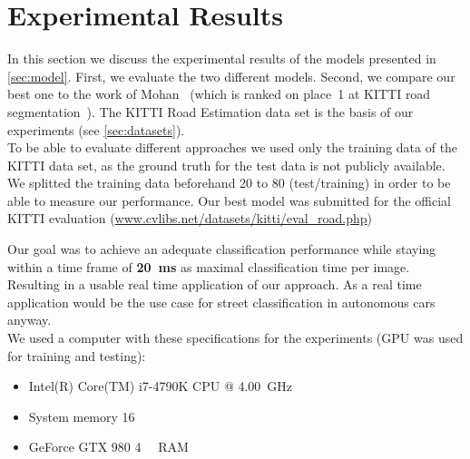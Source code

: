 
\section{Experimental Results}\label{sec:evaluation}

In this section we discuss the experimental results of the models
presented in \cref{sec:model}. First, we evaluate the two different
models. Second, we compare our best one to the work of
Mohan~\cite{Tarel2009} (which is ranked on place~1 at KITTI road
segmentation~\cite{Tarel2009}). The KITTI Road Estimation data set is the basis
of our experiments (see \cref{sec:datasets}). \\
To be able to evaluate different approaches we used only the
training data of the KITTI data set, as the ground truth for the test data is
not publicly available. We splitted the training data beforehand 20 to 80
(test/training) in order to be able to measure our performance. Our best model
was submitted for the official KITTI evaluation
(\href{http://www.cvlibs.net/datasets/kitti/eval_road.php}{www.cvlibs.net/datasets/kitti/eval\_road.php})


Our goal was to achieve an adequate classification performance while staying
within a time frame of \textbf{\SI{20}{\milli\second}} as maximal
classification time per image. Resulting in a usable real time application of
our approach. As a real time application would be the use case for street
classification in autonomous cars anyway.\\

We used a computer with these specifications for the experiments (GPU was used
for training and testing):
\begin{itemize}
    \item Intel(R) Core(TM) i7-4790K CPU @ \SI{4.00}{\giga\hertz}
    \item System memory \SI{16}{\gibi\byte}
    \item GeForce GTX 980 \SI{4}{\gibi\byte} RAM
\end{itemize}

